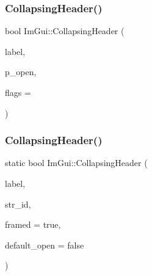 \hypertarget{namespace_im_gui_a19f369fc61f49ab7995ebb4da99028db}{}\label{namespace_im_gui_a19f369fc61f49ab7995ebb4da99028db} 
\subsubsection{\texorpdfstring{Collapsing\+Header()}{CollapsingHeader()}\hspace{0.1cm}{\footnotesize\ttfamily [2/3]}}
{\footnotesize\ttfamily bool Im\+Gui\+::\+Collapsing\+Header (\begin{DoxyParamCaption}\item[{const char $\ast$}]{label,  }\item[{bool $\ast$}]{p\+\_\+open,  }\item[{Im\+Gui\+Tree\+Node\+Flags}]{flags = {} }\end{DoxyParamCaption})}

\hypertarget{namespace_im_gui_a9c09b5eb6ecddb39c6374f1323e88cf3}{}\label{namespace_im_gui_a9c09b5eb6ecddb39c6374f1323e88cf3} 
\subsubsection{\texorpdfstring{Collapsing\+Header()}{CollapsingHeader()}\hspace{0.1cm}{\footnotesize\ttfamily [3/3]}}
{\footnotesize\ttfamily static bool Im\+Gui\+::\+Collapsing\+Header (\begin{DoxyParamCaption}\item[{const char $\ast$}]{label,  }\item[{const char $\ast$}]{str\+\_\+id,  }\item[{bool}]{framed = {\ttfamily true},  }\item[{bool}]{default\+\_\+open = {\ttfamily false} }\end{DoxyParamCaption})\hspace{0.3cm}{\ttfamily [static]}}

\hypertarget{namespace_im_gui_a82b18bfe08594b76c08894848d1e6fce}{}\label{namespace_im_gui_a82b18bfe08594b76c08894848d1e6fce} 
